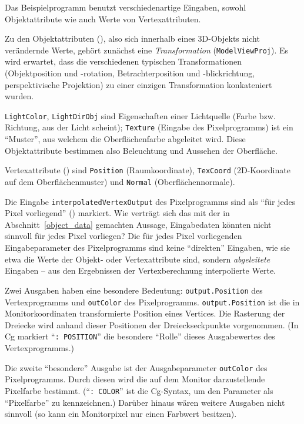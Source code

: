 \documentclass[twoside,a4paper,fleqn,12pt]{book}
\begin{document}
Das Beispielprogramm benutzt verschiedenartige Eingaben, sowohl Objektattribute wie auch Werte von Vertexattributen.

Zu den Objektattributen (), also sich innerhalb eines 3D-Objekts nicht verändernde Werte,
gehört zunächst eine \emph{Transformation} (\verb+ModelViewProj+). Es wird erwartet, dass die verschiedenen typischen Transformationen
(Objektposition und -rotation, Betrachterposition und -blickrichtung, perspektivische Projektion) zu einer einzigen Transformation konkateniert wurden.

\verb+LightColor+, \verb+LightDirObj+ sind Eigenschaften einer Lichtquelle (Farbe bzw. Richtung, aus der Licht scheint);
\verb+Texture+ (Eingabe des Pixelprogramms) ist ein "`Muster"', aus welchem die Oberflächenfarbe abgeleitet wird.
Diese Objektattribute bestimmen also Beleuchtung und Aussehen der Oberfläche.


Vertexattribute () sind \verb+Position+ (Raumkoordinate), \verb+TexCoord+ (2D-Koordinate auf dem Oberflächenmuster)
und \verb+Normal+ (Oberflächennormale).

Die Eingabe \verb+interpolatedVertexOutput+ des Pixelprogramms sind als "`für jedes Pixel vorliegend"' () markiert.
Wie verträgt sich das mit der in Abschnitt~\ref{object_data} gemachten Aussage, Eingabedaten könnten nicht sinnvoll für jedes
Pixel vorliegen? Die für jedes Pixel vorliegenden Eingabeparameter des Pixelprogramms sind keine "`direkten"' Eingaben,
wie sie etwa die Werte der Objekt- oder Vertexattribute sind, sondern \emph{abgeleitete} Eingaben --
aus den Ergebnissen der Vertexberechnung interpolierte Werte.

Zwei Ausgaben haben eine besondere Bedeutung: \verb+output.Position+ des Vertexprogramms und \verb+outColor+ des Pixelprogramms.
\verb+output.Position+ ist die in Monitorkoordinaten transformierte Position eines Vertices. Die Rasterung der Dreiecke wird anhand dieser
Positionen der Dreieckseckpunkte vorgenommen. (In Cg markiert ``\verb+: POSITION+'' die besondere "`Rolle"' dieses Ausgabewertes des Vertexprogramms.)

Die zweite "`besondere"' Ausgabe ist der Ausgabeparameter \verb+outColor+ des Pixelprogramms. Durch diesen wird die auf dem Monitor
darzustellende Pixelfarbe bestimmt. (``\verb+: COLOR+'' ist die Cg-Syntax, um den Parameter als "`Pixelfarbe"' zu kennzeichnen.)
Darüber hinaus wären weitere Ausgaben nicht sinnvoll (so kann ein Monitorpixel nur einen Farbwert besitzen).
\end{document}
